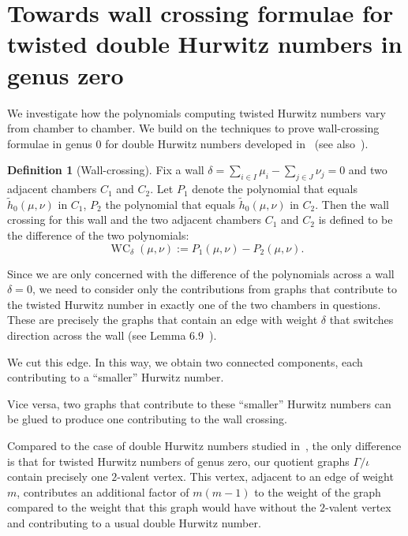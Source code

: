 \documentclass[10pt]{amsart}
\theoremstyle{plain}
\theoremstyle{definition}
\newtheorem{defi}[defi]{Definition}
\theoremstyle{definition}
\theoremstyle{plain}
\theoremstyle{plain}
\theoremstyle{remark}
\theoremstyle{plain}
\theoremstyle{plain}
\DeclareMathOperator {\WC}{WC}
\begin{document}
\section{Towards wall crossing formulae for twisted double Hurwitz numbers in genus zero}

We investigate how the polynomials computing twisted Hurwitz numbers vary from chamber to chamber. 
We build on the techniques to prove wall-crossing formulae in genus $0$ for double Hurwitz numbers developed in~\cite{CJM10} (see also~\cite{SSV08}). 

\begin{defi}[Wall-crossing]
Fix a wall $\delta=\sum_{i\in I}\mu_i - \sum_{j\in J}\nu_j=0$ and two adjacent chambers $C_1$ and $C_2$. Let $P_1$ denote the polynomial that equals $\tilde{h}_0(\mu,\nu)$ in $C_1$, $P_2$ the polynomial that equals $\tilde{h}_0(\mu,\nu)$ in $C_2$.
Then the wall crossing for this wall and the two adjacent chambers $C_1$ and $C_2$ is defined to be the difference of the two polynomials:
\begin{equation*}
\WC_{\delta}(\mu,\nu):=P_1(\mu,\nu)-P_2(\mu,\nu).
\end{equation*}

\end{defi}
 
Since we are only concerned with the difference of the polynomials across a wall $\delta=0$, we need to consider only the contributions from graphs that contribute to the twisted Hurwitz number in exactly one of the two chambers in questions. These are precisely the graphs that  contain an edge with weight $\delta$ that switches direction across the wall (see Lemma 6.9~\cite{CJM10}). 

We cut this edge. In this way, we obtain two connected components, each contributing to a ``smaller'' Hurwitz number.

Vice versa, two graphs that contribute to these ``smaller'' Hurwitz numbers can be glued to produce one contributing to the wall crossing.

Compared to the case of double Hurwitz numbers studied in~\cite{CJM10}, the only difference is that for twisted Hurwitz numbers of genus zero, our quotient graphs $\Gamma/\iota$ contain precisely one $2$-valent vertex. This vertex, adjacent to an edge of weight $m$, contributes an additional factor of $m(m-1)$ to the weight of the graph compared to the weight that this graph would have without the $2$-valent vertex and contributing to a usual double Hurwitz number.
\end{document}
